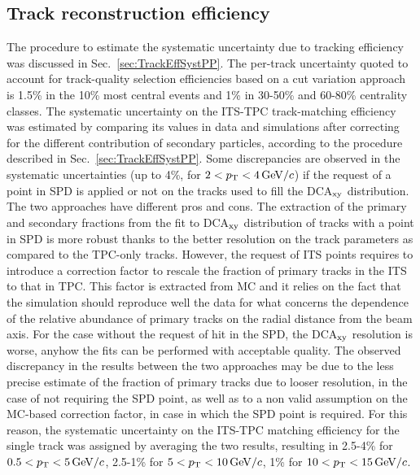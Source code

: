 \subsection{Track reconstruction efficiency}
\label{sec:TrackEffSystPbPb}
The procedure to estimate the systematic uncertainty due to
 tracking efficiency was discussed in Sec.~\ref{sec:TrackEffSystPP}.
The per-track uncertainty quoted to account for track-quality selection efficiencies
based on a cut variation approach is 1.5\% in the 10\% most central events and 1\% in 30-50\% and 60-80\% 
centrality classes. The systematic uncertainty on the ITS-TPC 
track-matching efficiency was estimated by comparing its values in data and simulations
after correcting for the different contribution of secondary particles, according to
the procedure described in Sec.~\ref{sec:TrackEffSystPP}.
Some discrepancies are observed in the systematic uncertainties (up to 4\%, for $2 < p_{\rm T} < 4\, \mathrm{GeV}/c$)
if the request of a point in SPD is applied or not on the tracks used to fill the DCA$_{\rm xy}$ distribution.
The two approaches have different pros and cons. The extraction of the primary
and secondary fractions from the fit to DCA$_{\rm xy}$ distribution of
tracks with a point in SPD is more robust thanks to the better resolution on the track 
parameters as compared to the TPC-only tracks. However, the request of
ITS points requires to introduce a correction factor to rescale the fraction of primary tracks in the ITS
to that in TPC. This factor is extracted from MC and it
relies on the fact that the simulation should reproduce well the data for what concerns
the dependence of the relative abundance of primary tracks on the radial distance from the beam axis.
For the case without the request of hit in the SPD, the DCA$_{\rm xy}$
resolution is worse, anyhow the fits can be performed with acceptable quality.
The observed discrepancy in the results between the two approaches 
may be due to the less precise estimate
of the fraction of primary tracks due to looser resolution, in the case of not requiring the SPD point, as well as
to a non valid assumption on the MC-based correction factor, in case in which 
the SPD point is required. For this reason, the systematic 
uncertainty on the ITS-TPC matching efficiency for the single track was
assigned by averaging the two results, resulting in
2.5-4\% for $0.5 < p_{\rm T} < 5 \, \mathrm{GeV}/c$, 2.5-1\% for $5 < p_{\rm T} < 10 \, \mathrm{GeV}/c$, 1\% for $10 < p_{\rm T} < 15\, \mathrm{GeV}/c$.\\


